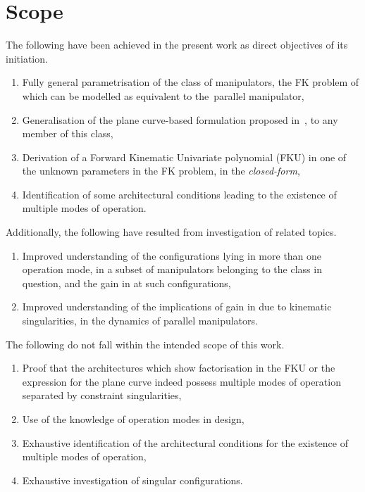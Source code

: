 \documentclass[DD]{iitmdiss}
\newcommand{\mcite}[1]{\cite{#1}}
\begin{document}
\section{Scope}
%
The following have been achieved in the present work as direct objectives of its initiation.
\begin{enumerate}
	\item Fully general parametrisation of the class of manipulators, the FK problem of which can be modelled as equivalent to the~\rps parallel manipulator,
	\item Generalisation of the plane curve-based formulation proposed in~\mcite{tk2017a}, to any member of this class,
	\item Derivation of a Forward Kinematic Univariate polynomial (FKU) in one of the unknown parameters in the FK problem, in the \emph{closed-form},
	\item Identification of some architectural conditions leading to the existence of multiple modes of operation.
\end{enumerate}
Additionally, the following have resulted from investigation of related topics.
\begin{enumerate}
	\item Improved understanding of the configurations lying in more than one operation mode, in a subset of manipulators belonging to the class in question, and the gain in \dof at such configurations,
	\item Improved understanding of the implications of gain in \dof due to kinematic singularities, in the dynamics of parallel manipulators.
\end{enumerate}
The following do not fall within the intended scope of this work.
\begin{enumerate}
	\item Proof that the architectures which show factorisation in the FKU or the expression for the plane curve indeed possess multiple modes of operation separated by constraint singularities,
	\item Use of the knowledge of operation modes in design,
	\item Exhaustive identification of the architectural conditions for the existence of multiple modes of operation,
	\item Exhaustive investigation of singular configurations.
\end{enumerate}
%
\end{document}
